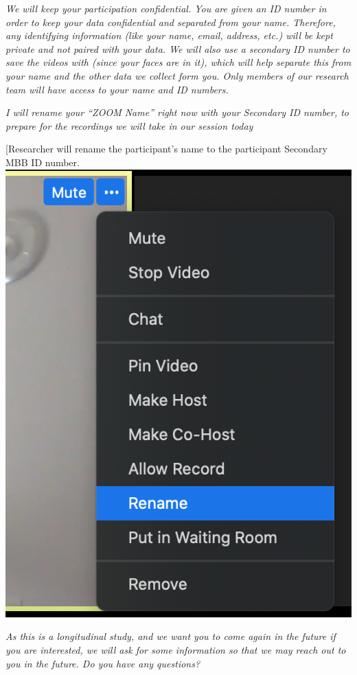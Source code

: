 \documentclass[]{book}
\begin{document}
\emph{We will keep your participation confidential. You are given an ID number in order to keep your data confidential and separated from your name. Therefore, any identifying information (like your name, email, address, etc.) will be kept private and not paired with your data. We will also use a secondary ID number to save the videos with (since your faces are in it), which will help separate this from your name and the other data we collect form you. Only members of our research team will have access to your name and ID numbers.}

\emph{I will rename your ``ZOOM Name'' right now with your Secondary ID number, to prepare for the recordings we will take in our session today}

{[}Researcher will rename the participant's name to the participant Secondary MBB ID number. \includegraphics{images/zoom_parent_child_interaction/1.png}

\emph{As this is a longitudinal study, and we want you to come again in the future if you are interested, we will ask for some information so that we may reach out to you in the future. Do you have any questions?}
\end{document}
